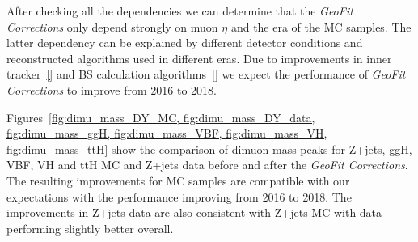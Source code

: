 
    

    

    

After checking all the dependencies we can determine that the \textit{GeoFit Corrections} only depend strongly on muon $\eta$ and the era of the MC samples. The latter dependency can be explained by different detector conditions and reconstructed algorithms used in different eras. Due to improvements in inner tracker~\ref{} and BS calculation algorithms~\ref{} we expect the performance of \textit{GeoFit Corrections} to improve from 2016 to 2018. 

Figures~\ref{fig:dimu_mass_DY_MC, fig:dimu_mass_DY_data, fig:dimu_mass_ggH, fig:dimu_mass_VBF, fig:dimu_mass_VH, fig:dimu_mass_ttH} show the comparison of dimuon mass peaks for Z+jets, ggH, VBF, VH and ttH MC and Z+jets data before and after the \textit{GeoFit Corrections}. The resulting improvements for MC samples are compatible with our expectations with the performance improving from 2016 to 2018. The improvements in Z+jets data are also consistent with Z+jets MC with data performing slightly better overall. 

